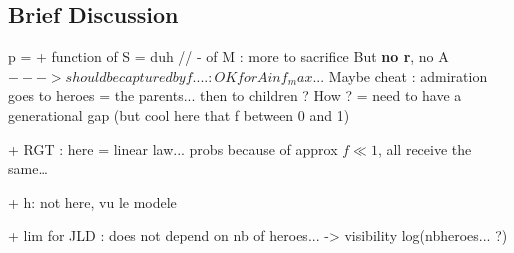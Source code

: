 \documentclass[a4paper,12pt]{report}
\begin{document}
\subsection{Brief Discussion}





p = + function of S = duh // - of M : more to sacrifice
But \textbf{no r}, no A
$---> should be captured by f.... : OK for A in f_max...$
Maybe cheat : admiration goes to heroes = the parents... then to children ? How ?
= need to have a generational gap (but cool here that f between 0 and 1)


+ RGT : here = linear law... probs because of approx $f\ll1$, all receive the same\dots

+ h: not here, vu le modele



+ lim for JLD : does not depend on nb of heroes... -> visibility log(nbheroes... ?)













\end{document}
